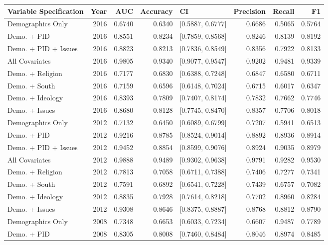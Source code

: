 \begin{longtable}{lrrrlrrr}
  \toprule
Variable Specification & Year & AUC & Accuracy & CI & Precision & Recall & F1 \\ 
  \midrule
Demographics Only & 2016 & 0.6740 & 0.6340 & [0.5887, 0.6777] & 0.6686 & 0.5065 & 0.5764 \\ 
  Demo. + PID & 2016 & 0.8551 & 0.8234 & [0.7859, 0.8568] & 0.8246 & 0.8139 & 0.8192 \\ 
  Demo. + PID + Issues & 2016 & 0.8823 & 0.8213 & [0.7836, 0.8549] & 0.8356 & 0.7922 & 0.8133 \\ 
  All Covariates & 2016 & 0.9805 & 0.9340 & [0.9077, 0.9547] & 0.9202 & 0.9481 & 0.9339 \\ 
  Demo. + Religion & 2016 & 0.7177 & 0.6830 & [0.6388, 0.7248] & 0.6847 & 0.6580 & 0.6711 \\ 
  Demo. + South & 2016 & 0.7159 & 0.6596 & [0.6148, 0.7024] & 0.6715 & 0.6017 & 0.6347 \\ 
  Demo. + Ideology & 2016 & 0.8393 & 0.7809 & [0.7407, 0.8174] & 0.7832 & 0.7662 & 0.7746 \\ 
  Demo. + Issues & 2016 & 0.8680 & 0.8128 & [0.7745, 0.8470] & 0.8357 & 0.7706 & 0.8018 \\ 
  Demographics Only & 2012 & 0.7132 & 0.6450 & [0.6089, 0.6799] & 0.7207 & 0.5941 & 0.6513 \\ 
  Demo. + PID & 2012 & 0.9216 & 0.8785 & [0.8524, 0.9014] & 0.8892 & 0.8936 & 0.8914 \\ 
  Demo. + PID + Issues & 2012 & 0.9452 & 0.8854 & [0.8599, 0.9076] & 0.8924 & 0.9035 & 0.8979 \\ 
  All Covariates & 2012 & 0.9888 & 0.9489 & [0.9302, 0.9638] & 0.9791 & 0.9282 & 0.9530 \\ 
  Demo. + Religion & 2012 & 0.7813 & 0.7058 & [0.6711, 0.7388] & 0.7406 & 0.7277 & 0.7341 \\ 
  Demo. + South & 2012 & 0.7591 & 0.6892 & [0.6541, 0.7228] & 0.7439 & 0.6757 & 0.7082 \\ 
  Demo. + Ideology & 2012 & 0.8835 & 0.7928 & [0.7614, 0.8218] & 0.7702 & 0.8960 & 0.8284 \\ 
  Demo. + Issues & 2012 & 0.9308 & 0.8646 & [0.8375, 0.8887] & 0.8768 & 0.8812 & 0.8790 \\ 
  Demographics Only & 2008 & 0.7348 & 0.6653 & [0.6033, 0.7234] & 0.6607 & 0.9487 & 0.7789 \\ 
  Demo. + PID & 2008 & 0.8305 & 0.8008 & [0.7460, 0.8484] & 0.8046 & 0.8974 & 0.8485 \\ 

\end{longtable}
